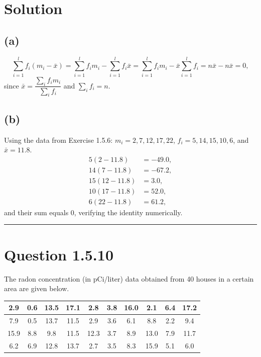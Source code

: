 \documentclass[12pt]{article}
\begin{document}
\section*{Solution}


\subsection*{(a)}
\[
\sum_{i=1}^l f_i(m_i-\bar{x})
= \sum_{i=1}^l f_i m_i - \sum_{i=1}^l f_i\bar{x}
= \sum_{i=1}^l f_i m_i - \bar{x}\sum_{i=1}^l f_i
= n\bar{x} - n\bar{x} = 0,
\]
since $\bar{x}=\dfrac{\sum_i f_i m_i}{\sum_i f_i}$ and $\sum_i f_i=n$.

\subsection*{(b)}
Using the data from Exercise 1.5.6: $m_i = 2,7,12,17,22$, $f_i = 5,14,15,10,6$, and $\bar{x}=11.8$.
\[
\begin{aligned}
5(2-11.8) &= -49.0,\\
14(7-11.8) &= -67.2,\\
15(12-11.8) &= 3.0,\\
10(17-11.8) &= 52.0,\\
6(22-11.8) &= 61.2,
\end{aligned}
\]
and their sum equals $0$, verifying the identity numerically.

\noindent\rule{\textwidth}{0.4pt} %


\section*{Question 1.5.10}
The radon concentration (in pCi/liter) data obtained from 40 houses in a certain area are given below.\\[6pt]

\begin{table}[h!]
\centering
\renewcommand{\arraystretch}{1.2}
\begin{tabular}{|c|c|c|c|c|c|c|c|c|c|}
\hline
2.9 & 0.6 & 13.5 & 17.1 & 2.8 & 3.8 & 16.0 & 2.1 & 6.4 & 17.2 \\ \hline
7.9 & 0.5 & 13.7 & 11.5 & 2.9 & 3.6 & 6.1 & 8.8 & 2.2 & 9.4 \\ \hline
15.9 & 8.8 & 9.8 & 11.5 & 12.3 & 3.7 & 8.9 & 13.0 & 7.9 & 11.7 \\ \hline
6.2 & 6.9 & 12.8 & 13.7 & 2.7 & 3.5 & 8.3 & 15.9 & 5.1 & 6.0 \\ \hline
\end{tabular}
\end{table}
\end{document}
